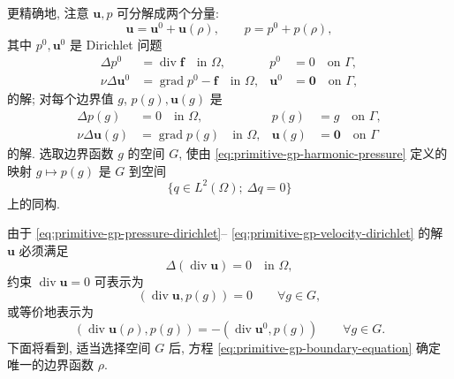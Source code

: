更精确地, 注意 $\mathbf u,p$ 可分解成两个分量:
\begin{equation}\label{eq:primitive-gp-splitting}
\mathbf u=\mathbf u^0+\mathbf u(\rho),
\qquad p=p^0+p(\rho),
\end{equation}
其中 $p^0,\mathbf u^0$ 是 Dirichlet 问题
\begin{subequations}\label{eq:primitive-gp-zero-boundary-problems}
\begin{align}
\Delta p^0&=\operatorname{div}\mathbf f\quad\text{in }\Omega,
&p^0&=0\quad\text{on }\Gamma,\label{eq:primitive-gp-zero-pressure}\\
\nu\Delta\mathbf u^0&=\operatorname{grad}p^0-\mathbf f\quad\text{in }\Omega,
&\mathbf u^0&=\mathbf0\quad\text{on }\Gamma,
\label{eq:primitive-gp-zero-velocity}
\end{align}
\end{subequations}
的解; 对每个边界值 $g$, $p(g),\mathbf u(g)$ 是
\begin{subequations}\label{eq:primitive-gp-harmonic-lifting-problems}
\begin{align}
\Delta p(g)&=0\quad\text{in }\Omega,
&p(g)&=g\quad\text{on }\Gamma,
\label{eq:primitive-gp-harmonic-pressure}\\
\nu\Delta\mathbf u(g)&=\operatorname{grad}p(g)\quad\text{in }\Omega,
&\mathbf u(g)&=\mathbf0\quad\text{on }\Gamma
\label{eq:primitive-gp-harmonic-velocity}
\end{align}
\end{subequations}
的解. 选取边界函数 $g$ 的空间 $G$, 使由
\eqref{eq:primitive-gp-harmonic-pressure} 定义的映射
$g\mapsto p(g)$ 是 $G$ 到空间
\[
\{q\in L^2(\Omega);\ \Delta q=0\}
\]
上的同构.

由于 \eqref{eq:primitive-gp-pressure-dirichlet}--
\eqref{eq:primitive-gp-velocity-dirichlet} 的解 $\mathbf u$ 必须满足
\[
\Delta(\operatorname{div}\mathbf u)=0\quad\text{in }\Omega,
\]
约束 $\operatorname{div}\mathbf u=0$ 可表示为
\[
(\operatorname{div}\mathbf u,p(g))=0\qquad\forall g\in G,
\]
或等价地表示为
\begin{equation}\label{eq:primitive-gp-boundary-equation}
(\operatorname{div}\mathbf u(\rho),p(g))
=-(\operatorname{div}\mathbf u^0,p(g))
\qquad\forall g\in G.
\end{equation}
下面将看到, 适当选择空间 $G$ 后, 方程
\eqref{eq:primitive-gp-boundary-equation} 确定唯一的边界函数 $\rho$.

